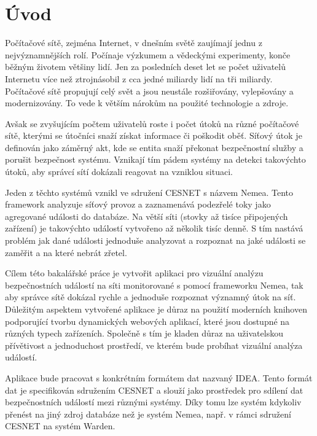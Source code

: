 
\chapter{Úvod}
Počítačové sítě, zejména Internet, v dnešním světě zaujímají jednu z nejvýznamnějších rolí. Počínaje výzkumem a vědeckými experimenty, konče běžným životem většiny lidí. Jen za posledních deset let se počet uživatelů Internetu více než ztrojnásobil z cca jedné miliardy lidí na tři miliardy. Počítačové sítě propujují celý svět a jsou neustále rozšiřovány, vylepšovány a modernizovány. To vede k větším nárokům na použité technologie a zdroje. 

Avšak se zvyšujícím počtem uživatelů roste i počet útoků na různé počítačové sítě, kterými se útočníci snaží získat informace či poškodit oběť. Síťový útok\cite{rfcAttack} je definován jako záměrný akt, kde se entita snaží překonat bezpečnostní služby a porušit bezpečnost systému. Vznikají tím pádem systémy na detekci takovýchto útoků, aby správcí sítí dokázali reagovat na vzniklou situaci.

Jeden z těchto systémů vznikl ve sdružení CESNET s názvem Nemea. Tento framework analyzuje síťový provoz a zaznamenává podezřelé toky jako agregované události do databáze. Na větší síti (stovky až tisíce připojených zařízení) je takovýchto událostí vytvořeno až několik tisíc denně. S tím nastává problém jak dané události jednoduše analyzovat a rozpoznat na jaké události se zaměřit a na které nebrát zřetel.

Cílem této bakalářské práce je vytvořit aplikaci pro vizuální analýzu bezpečnostních událostí na síti monitorované s pomocí frameworku Nemea, tak aby správce sítě dokázal rychle a jednoduše rozpoznat významný útok na síť. Důležitým aspektem vytvořené aplikace je důraz na použití moderních knihoven podporující tvorbu dynamických webových aplikací, které jsou dostupné na různých typech zařízeních. Společně s tím je kladen důraz na uživatelskou přívětivost a jednoduchost prostředí, ve kterém bude probíhat vizuální analýza událostí.

Aplikace bude pracovat s konkrétním formátem dat nazvaný IDEA. Tento formát dat je specifikován sdružením CESNET a slouží jako prostředek pro sdílení dat bezpečnostních událostí mezi různými systémy. Díky tomu lze systém kdykoliv přenést na jiný zdroj databáze než je systém Nemea, např. v rámci sdružení CESNET na systém Warden.

